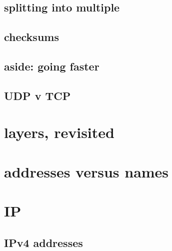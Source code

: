 \subsection{splitting into multiple}



\subsection{checksums}


\subsection{aside: going faster}


\subsection{UDP v TCP}


\section{layers, revisited}
% 


\section{addresses versus names}




% 



\section{IP}


\subsection{IPv4 addresses}



